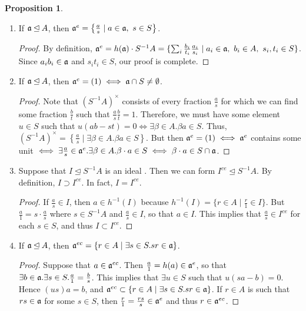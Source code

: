 \documentclass[10pt,letterpaper,cm]{nupset}
\theoremstyle{definition}
\theoremstyle{theorem}
\newtheorem{prop}[definition]{Proposition}
\theoremstyle{remark}
\newcommand{\1}{\mathbf{1}}
\newcommand{\0}{\vec 0}
\begin{document}
\begin{prop} $ $
\begin{enumerate}
\item If $\frak{a} \unlhd A$, then $\frak{a}^e = \left\{\frac{a}{s} \mid a\in \frak{a}, \ s \in S\right\}$.
\begin{proof}
By definition, $\frak{a}^e = h(\frak{a}) \cdot S^{-1}A = \{ \sum_{i} \frac{b_i}{t_i}\frac{a_i}{s_i} \mid a_i \in \frak{a}, \ b_i \in A, \ s_i, t_i \in S\}$. Since $a_ib_i \in \frak{a}$ and $s_it_i \in S$, our proof is complete.
\end{proof}
\item If $\frak{a} \unlhd A$, then $\frak{a}^e = (1) \iff \frak{a} \cap S \ne \emptyset$. 
\begin{proof}
Note that $(S^{-1}A)^{\times}$ consists of every fraction $\frac{a}{s}$ for which we can find some fraction $\frac{b}{t}$ such that $\frac{a}{s}\frac{b}{t} =1$. Therefore, we must have some element $u\in S$ such that $u(ab-st) = 0 \iff \exists \beta \in A. \beta a \in S$. Thus, $(S^{-1}A)^{\times} = \left\{\frac{a}{s} \mid \exists \beta \in A. \beta a \in S\right\}$. But then $\frak{a}^e = (1) \iff \frak{a}^e$ contains some unit $\iff \exists \frac{a}{s} \in \frak{a}^e. \exists \beta \in A. \beta \cdot a \in S \iff \beta \cdot a \in S\cap \frak{a}$.
\end{proof}
\item Suppose that $I \unlhd S^{-1}A$ is an ideal . Then we can form $I^{ce} \unlhd S^{-1}A$. By definition, $I \supset I^{ce}$. In fact, $I = I^{ce}$.  
\begin{proof}
If $\frac{a}{s} \in I$, then $a\in h^{-1}(I)$ because $h^{-1}(I) = \{ r\in A \mid \frac{r}{1}\in I \}$. But $\frac{a}{1}  = s\cdot \frac{a}{s}$ where $s\in S^{-1}A$ and $\frac{a}{s} \in I$, so that $a\in I$. This implies that $\frac{a}{s} \in I^{ ce}$ for each $s\in S$, and thus $I\subset I^{ce}$. 
\end{proof}
\item If $\frak{a} \unlhd A$, then $\frak{a}^{ec} = \{r\in A  \mid \exists s \in S. sr \in \frak{a}\}$. 
\begin{proof}
Suppose that $a\in \frak{a}^{ec}$. Then $\frac{a}{1} = h(a) \in  \frak{a}^e$, so that $\exists b \in \frak{a}.\exists s \in S. \frac{a}{1} = \frac{b}{s}$. This implies that $\exists u \in S$ such that $u(sa - b) =0$. Hence $(us)a = b$, and $\frak{a}^{ec} \subset \{r\in A  \mid \exists s \in S. sr \in \frak{a}\}$.  If $r\in A$ is such that $rs \in \frak{a}$ for some $s\in S$, then $\frac{r}{1} = \frac{rs}{s} \in \frak{a}^e$ and thus $r \in \frak{a}^{ec}$. 

\end{proof}
\end{enumerate}
\end{prop}
\end{document}
